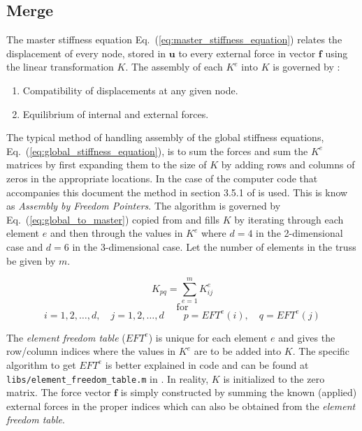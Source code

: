 \documentclass{article}
\begin{document}
\subsection{Merge}

The master stiffness equation Eq.~(\ref{eq:master_stiffness_equation}) relates
the displacement of every node, stored in $\mathbf{u}$ to every external force
in vector $\mathbf{f}$ using the linear transformation $K$.  The assembly of
each $K^e$ into $K$ is governed by \parencite{felippa2004ch3}:
\begin{enumerate}[noitemsep]
    \item Compatibility of displacements at any given node.
    \item Equilibrium of internal and external forces.
\end{enumerate}
The typical method of handling assembly of the global stiffness equations,
Eq.~(\ref{eq:global_stiffness_equation}), is to sum the forces and sum the
$K^e$ matrices by first expanding them to the size of $K$ by adding rows and
columns of zeros in the appropriate locations.  In the case of the computer
code that accompanies this document \parencite{shannon2016} the method in
section 3.5.1 of \cite{felippa2004ch3} is used.  This is know as
\emph{Assembly by Freedom Pointers}.  The algorithm is governed by
Eq.~(\ref{eq:global_to_master}) copied from \cite{felippa2004ch3} and fills $K$
by iterating through each element $e$ and then through the values in $K^e$
where $d=4$ in the 2-dimensional case and $d=6$ in the 3-dimensional case.
Let the number of elements in the truss be given by $m$.

\begin{minipage}{\textwidth}
\begin{equation*}
    K_{pq}=\sum_{e=1}^{m}K_{ij}^e
\end{equation*}
\begin{equation}
    \text{for}\label{eq:global_to_master}
\end{equation}
\begin{equation*}
    i=1,2,\ldots,d,\quad{}j=1,2,\ldots,d\qquad{}
    p=EFT^e(i),\quad{}q=EFT^e(j)
\end{equation*}
\vspace{0.1em}
\end{minipage}

The \emph{element freedom table} ($EFT^e$) is unique for each element $e$ and
gives the row/column indices where the values in $K^e$ are to be added into
$K$.  The specific algorithm to get $EFT^e$ is better explained in code and
can be found at \lstinline$libs/element_freedom_table.m$ in
\cite{shannon2016}.  In reality, $K$ is initialized to the zero matrix.  The
force vector $\mathbf{f}$ is simply constructed by summing the known (applied)
external forces in the proper indices which can also be obtained from the
\emph{element freedom table}.
\end{document}

